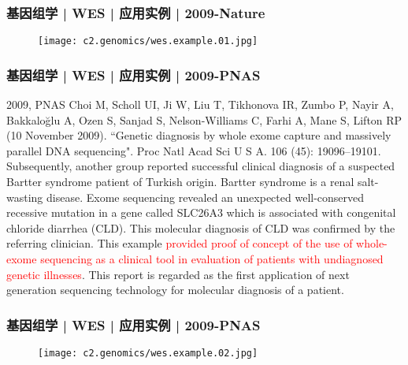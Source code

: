 \begin{frame}
  \frametitle{基因组学 | WES | 应用实例 | 2009-Nature}
  \begin{figure}
    \centering
    \texttt{[image: c2.genomics/wes.example.01.jpg]}
  \end{figure}
\end{frame}

\begin{frame}
  \frametitle{基因组学 | WES | 应用实例 | 2009-PNAS}
  \footnotesize{
  \begin{block}{2009, PNAS}
  Choi M, Scholl UI, Ji W, Liu T, Tikhonova IR, Zumbo P, Nayir A, Bakkaloğlu A, Ozen S, Sanjad S, Nelson-Williams C, Farhi A, Mane S, Lifton RP (10 November 2009). ``Genetic diagnosis by whole exome capture and massively parallel DNA sequencing". Proc Natl Acad Sci U S A. 106 (45): 19096–19101.\\
  \vspace{1em}
  Subsequently, another group reported successful clinical diagnosis of a suspected Bartter syndrome patient of Turkish origin. Bartter syndrome is a renal salt-wasting disease. Exome sequencing revealed an unexpected well-conserved recessive mutation in a gene called SLC26A3 which is associated with congenital chloride diarrhea (CLD). This molecular diagnosis of CLD was confirmed by the referring clinician. This example \textcolor{red}{provided proof of concept of the use of whole-exome sequencing as a clinical tool in evaluation of patients with undiagnosed genetic illnesses}. This report is regarded as the first application of next generation sequencing technology for molecular diagnosis of a patient.
  \end{block}
}
\end{frame}

\begin{frame}
  \frametitle{基因组学 | WES | 应用实例 | 2009-PNAS}
  \begin{figure}
    \centering
    \texttt{[image: c2.genomics/wes.example.02.jpg]}
  \end{figure}
\end{frame}

